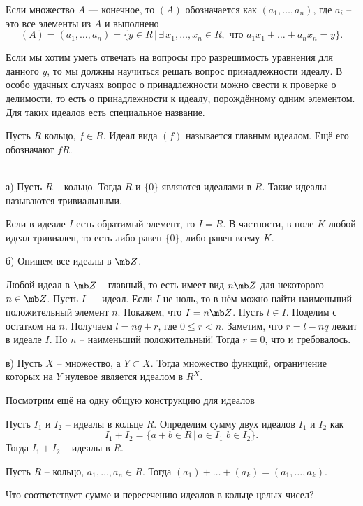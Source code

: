 \rm Если множество $A$ --- конечное, то $(A)$ обозначается как $(a_1,\dots,a_n)$, где $a_i$ -- это все элементы из $A$ и выполнено $$(A)=(a_1,\dots,a_n)=\{ y\in R \,|\, \exists\, x_1,\dots, x_n \in R,\text{ что } a_1 x_1 + \dots +a_n x_n =y\}.$$
\erm

Если мы хотим уметь отвечать на вопросы про разрешимость уравнения для данного $y$, то мы должны научиться
решать вопрос принадлежности идеалу. В особо удачных случаях вопрос о принадлежности можно свести к проверке о делимости, то есть о принадлежности к идеалу, порождённому одним элементом. Для таких идеалов есть специальное название.

 Пусть $R$ кольцо, $f\in R$. Идеал вида $(f)$  называется главным идеалом. Ещё его обозначают  $fR$.
\edfn

\exm\\
а) Пусть $R$ -- кольцо. Тогда $R$ и $\{0\}$ являются идеалами в $R$. Такие идеалы называются тривиальными.


\utv
Если в идеале $I$ есть обратимый элемент, то $I=R$. В частности, в поле $K$ любой идеал тривиален, то есть либо равен $\{0\}$, либо равен всему $K$.
\eutv

\noindent б) Опишем все идеалы в $\mb Z$.


\thrm Любой идеал в $\mb Z$ -- главный, то есть имеет вид $n\mb Z$ для некоторого $n\in \mb Z$. \ethrm
\proof Пусть $I$ --- идеал. Если $I$ не ноль, то в нём можно найти наименьший положительный элемент $n$. Покажем, что $I= n \mb Z$. Пусть $l\in I$. Поделим с остатком на $n$. Получаем $l=nq+r$, где $0\leq r<n$. Заметим, что $r=l-nq$ лежит в идеале $I$. Но $n$ -- наименьший положительный! Тогда $r=0$, что и требовалось.
\endproof

\noindent в) Пусть $X$ -- множество, а $Y\subset X$. Тогда множество функций, ограничение которых на $Y$ нулевое является идеалом в $R^X$.

Посмотрим ещё на одну общую конструкцию для идеалов

 Пусть $I_1$ и $I_2$ -- идеалы в кольце $R$. Определим сумму двух идеалов $I_1$ и $I_2$ как $$I_1+I_2=\{a+b\in R\,|\, a\in I_1\,\,b\in I_2\}.$$
Тогда $I_1+I_2$ -- идеалы в $R$.
\elm

\rm Пусть $R$ -- кольцо, $a_1,\dots,a_n \in R$. Тогда $(a_1)+\dots+(a_k)=(a_1,\dots,a_k)$.
\erm

Что соответствует сумме и пересечению идеалов в кольце целых чисел?










